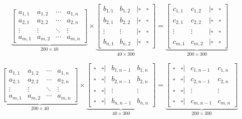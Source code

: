 \documentclass[10pt]{article}[draft]
\begin{document}
\begin{equation*}
	\underbrace{\begin{bmatrix}
			a_{1,1} & a_{1,2} & \cdots & a_{1,n}\\
			a_{2,1} & a_{2,2} & \cdots & a_{2,n}\\ 
			\vdots & \vdots & \ddots & \vdots\\ 
			a_{m,1} & a_{m,2} & \cdots & a_{m,n} 
	\end{bmatrix}}_{200 \times 40}
	\times
	\underbrace{\begin{bmatrix}
			b_{1,1} & b_{1,2} & | \square & \square \\
			b_{2,1} & b_{2,2} & | \square & \square \\ 
			\vdots & \vdots & | \square & \square \\ 
			b_{n,1} & b_{n,2} & | \square & \square 
	\end{bmatrix}}_{40 \times 300}
	=
	\underbrace{\begin{bmatrix}
			c_{1,1} & c_{1,2} & | \square & \square \\
			c_{2,1} & c_{2,2} & | \square & \square \\
			\vdots & \vdots & | \square & \square \\
			c_{m,1} & c_{m,2} & | \square & \square 
	\end{bmatrix}}_{200 \times 300}
\end{equation*}

\begin{equation*}
	\underbrace{\begin{bmatrix}
			a_{1,1} & a_{1,2} & \cdots & a_{1,n}\\
			a_{2,1} & a_{2,2} & \cdots & a_{2,n}\\ 
			\vdots & \vdots & \ddots & \vdots\\ 
			a_{m,1} & a_{m,2} & \cdots & a_{m,n} 
	\end{bmatrix}}_{200 \times 40}
	\times
	\underbrace{\begin{bmatrix}
			\square & \square | & b_{1,n-1} & b_{1,n}  \\
			\square & \square | & b_{2,n-1} & b_{2,n}   \\ 
			\square & \square | & \vdots & \vdots   \\ 
			\square & \square |  & b_{n,n-1} & b_{n,n}  
	\end{bmatrix}}_{40 \times 300}
	=
	\underbrace{\begin{bmatrix}
			\square & \square|  &c_{1,n-1} & c_{1,n}\\
			\square & \square |&c_{2,n-1} & c_{2,n} \\ 
			\square & \square |&\vdots & \vdots \\ 
			\square & \square | & c_{m,n-1}& c_{m,n}
	\end{bmatrix}}_{200 \times 300}
\end{equation*}
\end{document}
